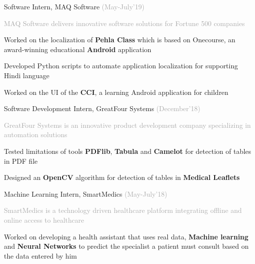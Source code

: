 \begin{cventries}
  \cventry
    {}
    {Software Intern, MAQ Software}
    {\fontsize{9pt}{1em} \textcolor{darkgray}{(May-July'19)}}
    {}
    {
      {\fontsize{9.5pt}{1em}\descriptionfont\textcolor{darkgray}{MAQ Software delivers innovative software solutions for Fortune 500 companies}}
      \vspace{4mm}
      \begin{cvitems}
        \item {Worked on the localization of \textbf{Pehla Class} which is based on Onecourse, an award-winning educational \textbf{Android} application}
        \vspace{0.3mm}
        \item {Developed Python scripts to automate application localization for supporting Hindi language}
        \vspace{0.3mm}
        \item{Worked on the UI of the \textbf{CCI},  a learning Android application for children}
      \end{cvitems}
    }
  \cventry
    {}
    {Software Development Intern, GreatFour Systems}
    {\fontsize{9pt}{1em} \textcolor{darkgray}{(December'18)}}
    {}
    {
      {\fontsize{9.5pt}{1em}\descriptionfont\textcolor{darkgray}{GreatFour Systems is an innovative product development company specializing in automation solutions}}
      \vspace{4mm}
      \begin{cvitems}
        \item {Tested limitations of tools \textbf{PDFlib}, \textbf{Tabula} and \textbf{Camelot} for detection of tables in PDF file}
        \vspace{0.3mm}
        \item {Designed an \textbf{OpenCV} algorithm for detection of tables in \textbf{Medical Leaflets} }
      \end{cvitems}
    }
  \cventry
    {}
    {Machine Learning Intern, SmartMedics}
    {\fontsize{9pt}{1em} \textcolor{darkgray}{(May-July'18)}}
    {}
    {
      {\fontsize{9.5pt}{1em}\descriptionfont\textcolor{darkgray}{SmartMedics is a technology driven healthcare platform integrating offline and online access to healthcare}}
      \vspace{4mm}
      \begin{cvitems}
        \item {Worked on developing a health assistant that uses real data, \textbf{Machine learning} and \textbf{Neural Networks} to predict the specialist a patient must consult based on the data entered by him}

\end{cvitems}}
\end{cventries}
